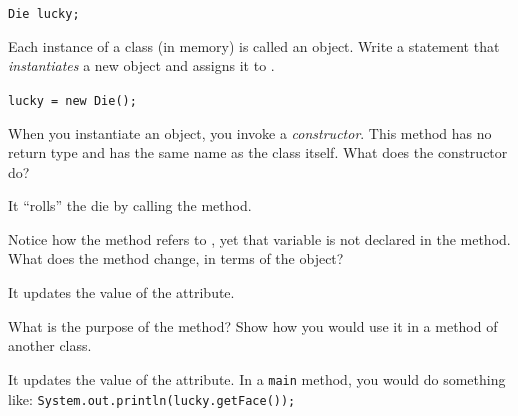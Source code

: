 \begin{answer}
\tt Die lucky;
\end{answer}


\Q Each instance of a class (in memory) is called an object. Write a statement that \emph{instantiates} a new  object and assigns it to .

\begin{answer}
\tt lucky = new Die();
\end{answer}


\Q When you instantiate an object, you invoke a \emph{constructor}.
This method has no return type and has the same name as the class itself. What does the  constructor do?

\begin{answer}
It ``rolls'' the die by calling the  method.
\end{answer}


\Q Notice how the  method refers to , yet that variable is not declared in the method. What does the  method change, in terms of the  object?

\begin{answer}
It updates the value of the  attribute.
\end{answer}


\Q What is the purpose of the  method? Show how you would use it in a  method of another class.

\begin{answer}
It updates the value of the  attribute. In a {\tt main} method, you would do something like: {\tt System.out.println(lucky.getFace());}
\end{answer}
